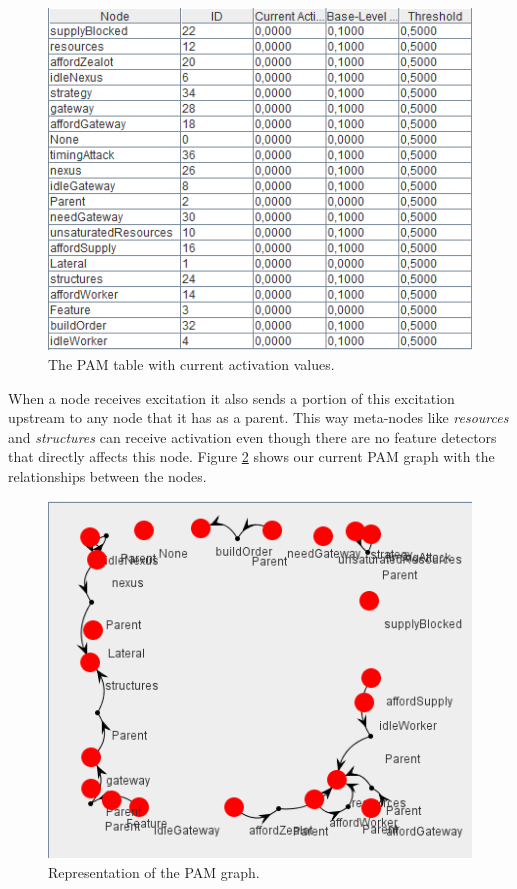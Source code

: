 \begin{figure}[h!tb]
\centering
\includegraphics[scale=1.0]{graphics/pam_table.png}
\caption{The PAM table with current activation values.}
\label{fig:pamtable}
\end{figure}

When a node receives excitation it also sends a portion of this excitation upstream to any node that it has as a parent. This way meta-nodes like {\em resources} and {\em structures} can receive activation even though there are no feature detectors that directly affects this node. Figure \ref{fig:pamgraph} shows our current PAM graph with the relationships  between the nodes. 

\begin{figure}[h!tb]
\centering
\includegraphics[scale=1.0]{graphics/pam_graph.png}
\caption{Representation of the PAM graph.}
\label{fig:pamgraph}
\end{figure}


